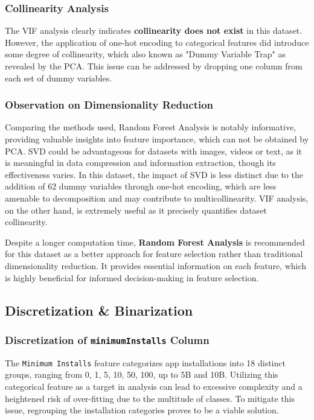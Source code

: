 \subsubsection{Collinearity Analysis}

The VIF analysis clearly indicates \textbf{collinearity does not exist} in this dataset. However, the application of one-hot encoding to categorical features did introduce some degree of collinearity, which also known as "Dummy Variable Trap" as revealed by the PCA. This issue can be addressed by dropping one column from each set of dummy variables.

\subsubsection{Observation on Dimensionality Reduction}

Comparing the methods used, Random Forest Analysis is notably informative, providing valuable insights into feature importance, which can not be obtained by PCA. SVD could be advantageous for datasets with images, videos or text, as it is meaningful in data compression and information extraction, though its effectiveness varies. In this dataset, the impact of SVD is less distinct due to the addition of 62 dummy variables through one-hot encoding, which are less amenable to decomposition and may contribute to multicollinearity. VIF analysis, on the other hand, is extremely useful as it precisely quantifies dataset collinearity.

Despite a longer computation time, \textbf{Random Forest Analysis} is recommended for this dataset as a better approach for feature selection rather than traditional dimensionality reduction. It provides essential information on each feature, which is highly beneficial for informed decision-making in feature selection.

\subsection{Discretization \& Binarization}
\subsubsection{Discretization of \texttt{minimumInstalls} Column}

The \texttt{Minimum Installs} feature categorizes app installations into 18 distinct groups, ranging from 0, 1, 5, 10, 50, 100, up to 5B and 10B. Utilizing this categorical feature as a target in analysis can lead to excessive complexity and a heightened risk of over-fitting due to the multitude of classes. To mitigate this issue, regrouping the installation categories proves to be a viable solution.

